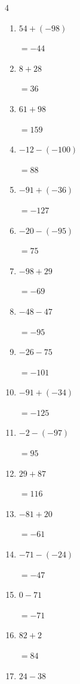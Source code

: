 \begin{multicols}{4}
\begin{enumerate}
  \item $54+(-98)$

        $=-44$

  \item $8+28$

        $=36$

  \item $61+98$

        $=159$

  \item $-12-(-100)$

        $=88$

\columnbreak %

  \item $-91+(-36)$

        $=-127$

  \item $-20-(-95)$

        $=75$

  \item $-98+29$

        $=-69$

  \item $-48-47$

        $=-95$

  \item $-26-75$

        $=-101$

  \item $-91+(-34)$

        $=-125$

  \item $-2-(-97)$

        $=95$

  \item $29+87$

        $=116$

  \item $-81+20$

        $=-61$

  \item $-71-(-24)$

        $=-47$

  \item $0-71$

        $=-71$

  \item $82+2$

        $=84$

  \item $24-38$


\end{enumerate}
\end{multicols}
